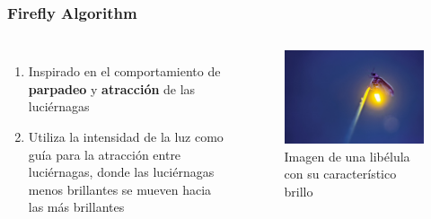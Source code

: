 \begin{frame}
  \frametitle{Firefly Algorithm}
  \begin{columns}
    \begin{enumerate}
      \item Inspirado en el comportamiento de \textbf{parpadeo} y \textbf{atracción} de las luciérnagas
      \item Utiliza la intensidad de la luz como guía para la atracción entre luciérnagas, donde las luciérnagas menos brillantes se mueven hacia las más brillantes
    \end{enumerate}
    \begin{figure}
      \begin{center}
        \includegraphics[width=\textwidth]{imagenes/chapter3/firefly.jpg}
      \end{center}
      \caption{Imagen de una libélula con su característico brillo}
    \end{figure}
  \end{columns}
\end{frame}

